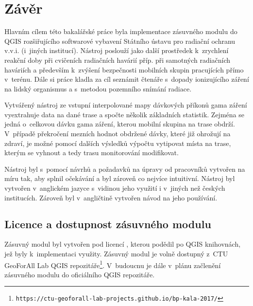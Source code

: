 \chapter{Závěr}
\label{5-zaver}

Hlavním cílem této bakalářské práce byla implementace zásuvného modulu
do QGIS rozšiřujícího softwarové vybavení Státního ústavu pro radiační
ochranu v.v.i. (i~jiných institucí). Nástroj poslouží jako další
prostředek k~zrychlení reakční doby při cvičeních radiačních havárií
příp. při samotných radiačních haváriích a především k~zvýšení
bezpečnosti mobilních skupin pracujících přímo v~terénu. Dále si práce
kladla za cíl seznámit čtenáře s~dopady ionizujícího záření na lidský
organismus a s~metodou pozemního snímání radiace.

Vytvářený nástroj ze vstupní interpolované mapy dávkových příkonů gama
záření vyextrahuje data na dané trase a spočte několik základních
statistik. Zejména se jedná o~celkovou dávku gama záření, kterou
mobilní skupina na trase obdrží. V~případě překročení mezních hodnot
obdržené dávky, které již ohrožují na zdraví, je možné pomocí dalších
výsledků výpočtu vytipovat místa na trase, kterým se vyhnout a tedy
trasu monitorování modifikovat.

Nástroj byl s~pomocí návrhů a požadavků na úpravy od pracovníků
 vytvořen na míru tak, aby splnil očekávání a byl zároveň co
nejvíce intuitivní. Nástroj byl vytvořen v~anglickém jazyce s~vidinou
jeho využití i v~jiných než českých institucích. Zároveň byl
v~angličtině vytvořen návod na jeho používání.


\section{Licence a dostupnost zásuvného modulu} Zásuvný modul byl
vytvořen pod licencí , kterou podědil po QGIS knihovnách,
jež byly k~implementaci využity. Zásuvný modul je volně dostupný z~CTU
GeoForAll Lab QGIS
repozitáře\footnote{\texttt{https://ctu-geoforall-lab-projects.github.io/bp-kala-2017/}}. V~budoucnu
je dále v~plánu začlenění zásuvného modulu do oficiálního QGIS
repozitáře.

 



